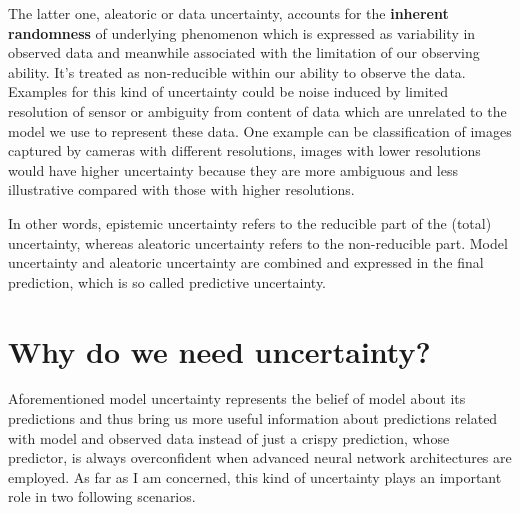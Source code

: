 The latter one, aleatoric or data uncertainty, accounts for the \textbf{inherent randomness} of underlying phenomenon which is expressed as variability in observed data and meanwhile associated with the limitation of our observing ability. It's treated as non-reducible within our ability to observe the data. Examples for this kind of uncertainty could be noise induced by limited resolution of sensor or ambiguity from content of data which are unrelated to the model we use to represent these data. One example can be classification of images captured by cameras with different resolutions, images with lower resolutions would have higher uncertainty because they are more ambiguous and less illustrative compared with those with higher resolutions. 

In other words, epistemic uncertainty refers to the reducible part of the (total) uncertainty, whereas aleatoric uncertainty
refers to the non-reducible part. Model uncertainty and aleatoric uncertainty are combined and expressed in the final prediction, which is so called predictive uncertainty.

\section{Why do we need uncertainty?}
Aforementioned model uncertainty represents the belief of model about its predictions and thus bring us more useful information about predictions related with model and observed data instead of just a crispy prediction, whose predictor, is always overconfident when advanced neural network architectures are employed\cite{guo2017calibration}. As far as I am concerned, this kind of uncertainty plays an important role in two following scenarios. 


